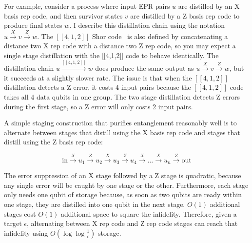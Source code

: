 \documentclass[onecolumn,unpublished,a4paper]{quantumarticle}
\theoremstyle{definition}
\theoremstyle{definition}
\theoremstyle{definition}
\begin{document}
For example, consider a process where input EPR pairs $u$ are distilled by an X basis rep code, and then survivor states $v$ are distilled by a Z basis rep code to produce final states $w$.
I describe this distillation chain using the notation $u \xrightarrow{X} v \xrightarrow{Z} w$.
The $[[4,1,2]]$ Shor code~\cite{shor1995qec} is also defined by concatenating a distance two X rep code with a distance two Z rep code, so you may expect a single stage distillation with the [[4,1,2]] code to behave identically.
The distillation chain $u \xrightarrow{[[4,1,2]]} w$ does produce the same output as $u \xrightarrow{X} v \xrightarrow{Z} w$, but it succeeds at a slightly slower rate.
The issue is that when the $[[4,1,2]]$ distillation detects a Z error, it costs 4 input pairs because the $[[4,1,2]]$ code takes all 4 data qubits in one group.
The two stage distillation detects Z errors during the first stage, so a Z error will only costs 2 input pairs.

A simple staging construction that purifies entanglement reasonably well is to alternate between stages that distill using the X basis rep code and stages that distill using the Z basis rep code:

$$\text{in} \xrightarrow{X} u_1 \xrightarrow{Z} u_2 \xrightarrow{X} u_3 \xrightarrow{Z} u_4 \xrightarrow{X} \dots \xrightarrow{X} u_{n} \xrightarrow{Z} \text{out}$$

The error suppression of an X stage followed by a Z stage is quadratic, because any single error will be caught by one stage or the other.
Furthermore, each stage only needs one qubit of storage because, as soon as two qubits are ready within one stage, they are distilled into one qubit in the next stage.
$O(1)$ additional stages cost $O(1)$ additional space to square the infidelity.
Therefore, given a target $\epsilon$, alternating between X rep code and Z rep code stages can reach that infidelity using $O(\log \log \frac{1}{\epsilon})$ storage.
\end{document}
